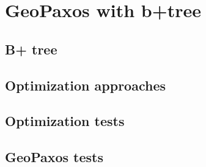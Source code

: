 \chapter{GeoPaxos with b+tree}\label{sec:geopaxos-with-b+tree}


\section{B+ tree}\label{sec:B+tree}


\section{Optimization approaches}\label{sec:optimization-approaches}


\section{Optimization tests}\label{sec:optimization-tests}

\section{GeoPaxos tests}\label{sec:geopaxos-tests}